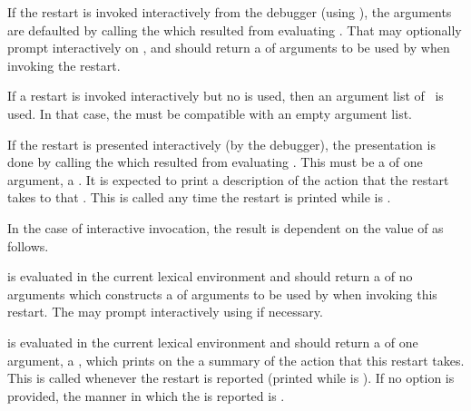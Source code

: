 If the restart is invoked interactively from the debugger 
(using ), 
the arguments are defaulted by calling the  
which resulted from evaluating .
That  may optionally prompt interactively on , 
and should return a  of arguments to be used by
 when invoking the restart. 
 
If a restart is invoked interactively but no  is used,
then an argument list of \nil\ is used. In that case, the 
must be compatible with an empty argument list.
 
If the restart is presented interactively (\eg by the debugger),
the presentation is done by calling the  which resulted
from evaluating .
This  must be a  of one argument, a . 
It is expected to print a description of the action that the restart takes
to that . 
This  is called any time the restart is printed 
while  is \nil.
 
In the case of interactive invocation, 
the result is dependent on the value of 
as follows.

\beginlist
{}

   is evaluated in the current lexical environment and
  should return a  of no arguments which constructs a 
   of arguments to be used by  
  when invoking this restart.  The  may prompt interactively
  using  if necessary.


   is evaluated in the current lexical environment and
  should return a  of one argument, a , which
  prints on the  a summary of the action that this restart
  takes.  This  is called whenever the restart is
  reported (printed while  is \nil).
  If no  option is provided, the manner in which the
   is reported is .


